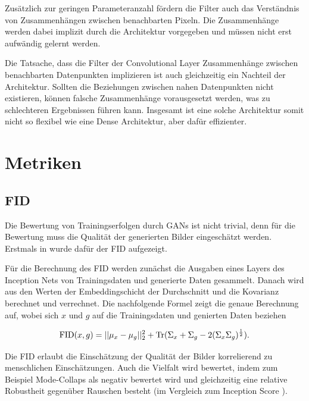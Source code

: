 Zusätzlich zur geringen Parameteranzahl fördern die Filter auch das Verständnis von Zusammenhängen zwischen benachbarten Pixeln.
Die Zusammenhänge werden dabei implizit durch die Architektur vorgegeben und müssen nicht erst aufwändig gelernt werden.
\newline

Die Tatsache, dass die Filter der Convolutional Layer Zusammenhänge zwischen benachbarten Datenpunkten implizieren ist auch gleichzeitig ein Nachteil der Architektur.
Sollten die Beziehungen zwischen nahen Datenpunkten nicht existieren, können falsche Zusammenhänge vorausgesetzt werden, was zu schlechteren Ergebnissen führen kann.
Insgesamt ist eine solche Architektur somit nicht so flexibel wie eine Dense Architektur, aber dafür effizienter.

\section{Metriken}
\subsection{FID}	
Die Bewertung von Trainingserfolgen durch GANs ist nicht trivial, denn für die Bewertung muss die Qualität der generierten Bilder eingeschätzt werden.
Erstmals in \cite{fid} wurde dafür der \acrfull{FID} aufgezeigt.

Für die Berechnung des \acrshort{FID} werden zunächst die Ausgaben eines Layers des Inception Nets von Trainingsdaten und generierte Daten gesammelt.
Danach wird aus den Werten der Embeddingschicht der Durchschnitt und die Kovarianz berechnet und verrechnet.
Die nachfolgende Formel \cite{are-gans-created-equally} zeigt die genaue Berechnung auf, wobei sich $x$ und $g$ auf die Trainingsdaten und genierten Daten beziehen

\begin{equation}
	\operatorname{FID}(x, g) = ||\mu_x - \mu_g||_2^2 + \operatorname{Tr}(\Sigma_x + \Sigma_g - 2(\Sigma_x \Sigma_g)^{\frac{1}{2}}).
\end{equation}

Die \acrshort{FID} erlaubt die Einschätzung der Qualität der Bilder korrelierend zu menschlichen Einschätzungen.
Auch die Vielfalt wird bewertet, indem zum Beispiel Mode-Collaps als negativ bewertet wird und gleichzeitig eine relative Robustheit gegenüber Rauschen besteht (im Vergleich zum Inception Score \cite{are-gans-created-equally}). 

